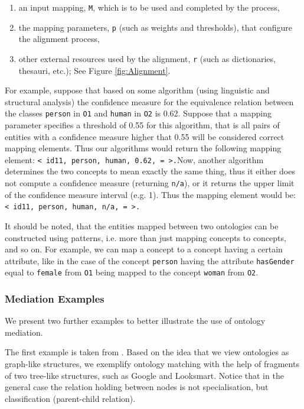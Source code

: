 \begin{enumerate}
\item an input mapping, \texttt{M}, which is to be used and
completed by the process, 
\item the mapping parameters, \texttt{p} (such as weights
and thresholds), that configure the alignment process, 
\item other external resources used by the alignment,
\texttt{r} (such as dictionaries, thesauri, etc.); See Figure \ref{fig:Alignment}. 
\end{enumerate}
For example, suppose that based on some algorithm (using linguistic and
structural analysis) the confidence measure for the equivalence
relation between the classes \texttt{person} in
\texttt{O1} and \texttt{human} in
\texttt{O2} is 0.62. Suppose that a mapping parameter
specifies a threshold of 0.55 for this algorithm, that is all pairs of
entities with a confidence measure higher that 0.55 will be considered
correct mapping elements. Thus our algorithms would return the
following mapping element: \texttt{{\textless} id11,
person, human, 0.62, = {\textgreater}.}Now, another algorithm
determines the two concepts to mean exactly the same thing, thus it
either does not compute a confidence measure (returning
\texttt{n/a}), or it returns the upper limit of the
confidence measure interval (e.g. 1). Thus the mapping element would
be: \texttt{{\textless} id11, person, human, n/a, =
{\textgreater}.} 

It should be noted, that the entities mapped between two ontologies can
be constructed using patterns, i.e. more than just mapping concepts to
concepts, and so on. For example, we can map a concept to a concept
having a certain attribute, like in the case of the concept
\texttt{person} having the attribute
\texttt{hasGender} equal to \texttt{female}
from \texttt{O1} being mapped to the concept
\texttt{woman} from \texttt{O2}. 

\subsubsection{Mediation Examples}
\label{subsec:mediationproblem_examples}
We present two further examples to better illustrate the use of ontology
mediation. 

The first example is taken from \cite{giunchiglia2008evaluation}. Based on the
idea that we view ontologies as graph-like structures, we exemplify
ontology matching with the help of fragments of two tree-like
structures, such as Google and Looksmart. Notice that in the general
case the relation holding between nodes is not specialisation, but
classification (parent-child relation). 

